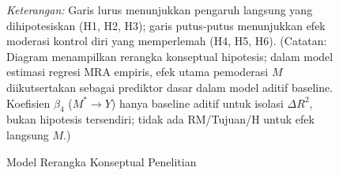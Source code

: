 \documentclass[12pt,a4paper]{article}
\numberwithin{equation}{section}
\numberwithin{table}{section}
\numberwithin{figure}{section}
\begin{document}
\begin{figure}[H]
{\begin{tikzpicture}
\end{tikzpicture}
}
\caption{Model Rerangka Konseptual Penelitian}
\label{fig:rerangka_penelitian}
\begin{flushleft}
  \footnotesize\textit{Keterangan:} Garis lurus menunjukkan pengaruh langsung yang dihipotesiskan (H1, H2, H3); garis putus-putus menunjukkan efek moderasi kontrol diri yang memperlemah (H4, H5, H6). (Catatan: Diagram menampilkan rerangka konseptual hipotesis; dalam model estimasi regresi MRA empiris, efek utama pemoderasi $M$ diikutsertakan sebagai prediktor dasar dalam model aditif baseline. Koefisien $\beta_4$ ($M^* \rightarrow Y$) hanya baseline aditif untuk isolasi $\Delta R^2$, bukan hipotesis tersendiri; tidak ada RM/Tujuan/H untuk efek langsung $M$.)
\end{flushleft}
\end{figure}

\newpage
\renewcommand{\refname}{DAFTAR PUSTAKA}

\nocite{sekaran2016research, sugiyono2019metode, hair2019multivariate, ghozali2018aplikasi}

\end{document}
